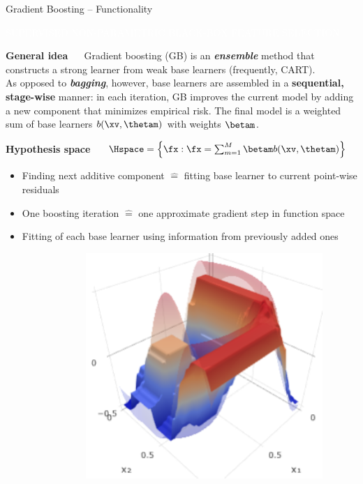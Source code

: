 \documentclass[11pt,compress,t,notes=noshow, xcolor=table]{beamer}
\newcommand{\bfit}[1]{\textbf{\textit{#1}}}
\newcommand{\maketag}[1]{\colorbox{highlightcol}{\textcolor{white}
{\MakeUppercase{#1}}}}
\newcommand{\highlight}[1]{\textcolor{highlightcol}{\textbf{#1}}}
\begin{document}
\begin{frame}{Gradient Boosting -- Functionality}

\vspace{0.3cm}

\footnotesize

\maketag{SUPERVISED}
\maketag{NON-PARAMETRIC}
\maketag{BLACK-BOX}
\maketag{FEATURE SELECTION}

\medskip

\highlight{General idea} ~~ Gradient boosting (GB) is an
\bfit{ensemble} method that constructs a strong learner from weak 
base learners (frequently, CART). \\
As opposed to \bfit{bagging}, however, base learners are assembled
in a \textbf{sequential, stage-wise} manner: in each iteration, GB improves the 
current model by adding a new component that minimizes empirical risk. The final 
model is a weighted sum of base learners $b(\xv, \thetam)$ with weights 
$\betam$.

\medskip

\highlight{Hypothesis space} ~~
$\Hspace = \left\{ \fx: \fx = \sum_{m = 1}^M \betam b(\xv, \thetam) \right\}$

\medskip

\begin{minipage}{0.6\textwidth}
  \begin{itemize}
    \item Finding next additive component $\widehat{=}$ fitting base learner
    to current point-wise residuals  
    \item One boosting iteration $\widehat{=}$ one approximate gradient step in 
    function space
    \item Fitting of each base learner using information from previously
    added ones
  \end{itemize}
\end{minipage}%
\begin{minipage}{0.4\textwidth}
  \includegraphics[width=0.9\textwidth]{figure/gb_3d.PNG}
\end{minipage}

\end{frame}
\end{document}
